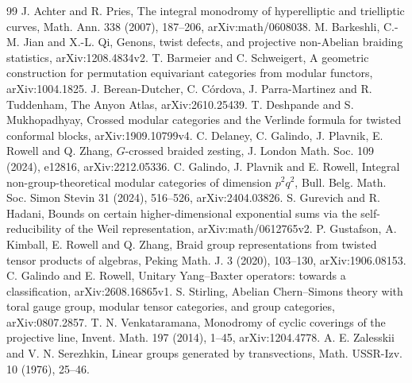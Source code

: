 \documentclass[11pt]{amsart}
\begin{document}
\begin{thebibliography}{99}
 J. Achter and R. Pries, The integral monodromy of hyperelliptic
and trielliptic curves, Math. Ann. 338 (2007), 187--206, arXiv:math/0608038.
 M. Barkeshli, C.-M. Jian and X.-L. Qi, Genons, twist defects,
and projective non-Abelian braiding statistics, arXiv:1208.4834v2.
 T. Barmeier and C. Schweigert, A geometric construction for
permutation equivariant categories from modular functors, arXiv:1004.1825.
 J. Berean-Dutcher, C. C\'ordova, J. Parra-Martinez and
R. Tuddenham, The Anyon Atlas, arXiv:2610.25439.
 T. Deshpande and S. Mukhopadhyay, Crossed modular categories
and the Verlinde formula for twisted conformal blocks, arXiv:1909.10799v4.
 C. Delaney, C. Galindo, J. Plavnik, E. Rowell and Q. Zhang,
$G$-crossed braided zesting, J. London Math. Soc. 109 (2024), e12816,
arXiv:2212.05336.
 C. Galindo, J. Plavnik and E. Rowell, Integral
non-group-theoretical modular categories of dimension $p^2q^2$,
Bull. Belg. Math. Soc. Simon Stevin 31 (2024), 516--526, arXiv:2404.03826.
 S. Gurevich and R. Hadani, Bounds on certain higher-dimensional
exponential sums via the self-reducibility of the Weil representation,
arXiv:math/0612765v2.
 P. Gustafson, A. Kimball, E. Rowell and Q. Zhang,
Braid group representations from twisted tensor products of algebras,
Peking Math. J. 3 (2020), 103--130, arXiv:1906.08153.
 C. Galindo and E. Rowell, Unitary Yang--Baxter operators:
towards a classification, arXiv:2608.16865v1.
 S. Stirling, Abelian Chern--Simons theory with toral
gauge group, modular tensor categories, and group categories,
arXiv:0807.2857.
 T. N. Venkataramana, Monodromy of cyclic coverings of the
projective line, Invent. Math. 197 (2014), 1--45, arXiv:1204.4778.
 A. E. Zalesskii and V. N. Serezhkin, Linear groups generated
by transvections, Math. USSR-Izv. 10 (1976), 25--46.
\end{thebibliography}
\end{document}

